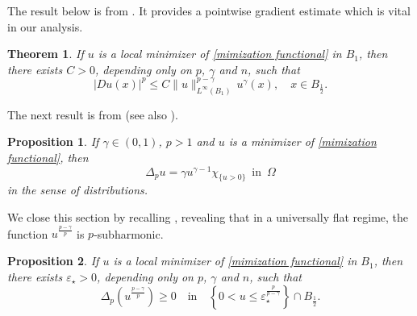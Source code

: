 \documentclass[11pt, reqno]{amsart}
\newtheorem{theorem}{Theorem}
\newtheorem{proposition}{Proposition}
\numberwithin{equation}{section}
\numberwithin{theorem}{section}
\numberwithin{lemma}{section}
\numberwithin{corollary}{section}
\numberwithin{remark}{section}
\numberwithin{proposition}{section}
\numberwithin{definition}{section}
\begin{document}
The result below is from \cite[Theorem 3.1]{ATU25}. It provides a pointwise gradient estimate which is vital in our analysis.
\begin{theorem}\label{magic theorem}
If $u$ is a local minimizer of \eqref{mimization functional} in $B_1$, then there exists $C>0$, depending only on $p$, $\gamma$ and $n$, such that
$$
|Du(x)|^p\le C\|u\|_{L^\infty(B_1)}^{p-\gamma}\, u^{\gamma}(x),\quad x\in B_{\frac{1}{2}}.
$$
\end{theorem}
The next result is from \cite[Proposition 3.3]{LQT15} (see also \cite[Theorem 2.8]{Ph83}).
\begin{proposition}\label{equation in the sense of distributions}
    If $\gamma\in(0,1)$, $p>1$ and $u$ is a minimizer of \eqref{mimization functional}, then
    $$
    \Delta_pu=\gamma u^{\gamma-1}\chi_{\{u>0\}}\,\,\,\text{in}\,\,\,\Omega
    $$
    in the sense of distributions.
\end{proposition}
We close this section by recalling \cite[Proposition 5.1]{ATU25}, revealing that in a universally flat regime, the function $u^{\frac{p-\gamma}{p}}$ is $p$-subharmonic.
\begin{proposition}\label{subsol}
If $u$ is a local minimizer of \eqref{mimization functional} in $B_1$, then there exists $\varepsilon_\star>0$, depending only on $p$, $\gamma$ and $n$, such that 
$$
\Delta_p\left(u^{\frac{p-\gamma}{p}}\right)\ge0 \quad \mbox{in} \quad \left\{0<u\le\varepsilon_\star^{\frac{p}{p-\gamma}}\right\} \cap B_{\frac{1}{2}}.
$$
\end{proposition}
\end{document}
